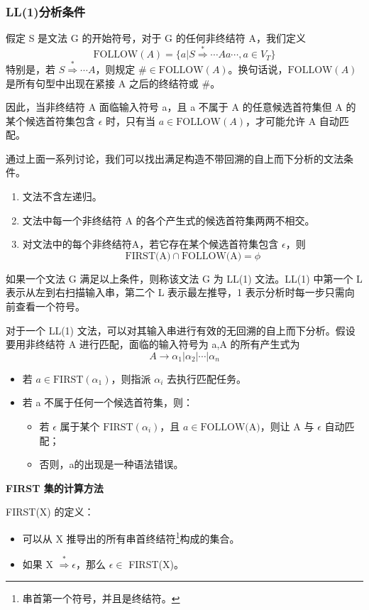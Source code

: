\subsubsection{LL(1)分析条件}

假定 S 是文法 G 的开始符号，对于 G 的任何非终结符 A，我们定义
\[ \text{FOLLOW}(A) = \{ a|S\stackrel{*}{\Rightarrow} \cdots Aa \cdots, a\in V_T \} \]
特别是，若 $S\stackrel{*}{\Rightarrow} \cdots A$，则规定 $\# \in \text{FOLLOW}(A)$。换句话说，$\text{FOLLOW}(A)$ 是所有句型中出现在紧接 A 之后的终结符或 \#。

因此，当非终结符 A 面临输入符号 a，且 a 不属于 A 的任意候选首符集但 A 的某个候选首符集包含 $\epsilon$ 时，只有当 $a \in \text{FOLLOW}(A)$，才可能允许 A 自动匹配。

通过上面一系列讨论，我们可以找出满足构造不带回溯的自上而下分析的文法条件。
\begin{enumerate}
    \item 文法不含左递归。
    \item 文法中每一个非终结符 A 的各个产生式的候选首符集两两不相交。
    \item 对文法中的每个非终结符A，若它存在某个候选首符集包含 $\epsilon$，则
    \[ \text{FIRST(A)} \cap \text{FOLLOW(A)} = \phi \]
\end{enumerate}
如果一个文法 G 满足以上条件，则称该文法 G 为 LL(1) 文法。LL(1) 中第一个 L 表示从左到右扫描输入串，第二个 L 表示最左推导，1 表示分析时每一步只需向前查看一个符号。 

对于一个 LL(1) 文法，可以对其输入串进行有效的无回溯的自上而下分析。假设要用非终结符 A 进行匹配，面临的输入符号为 a,A 的所有产生式为
\[ A \rightarrow \alpha_1 | \alpha_2 | \cdots | \alpha_n \]
\begin{itemize}
    \item 若 $a\in \text{FIRST}(\alpha_1)$，则指派 $\alpha_i$ 去执行匹配任务。
    \item 若 a 不属于任何一个候选首符集，则：
    \begin{itemize}
        \item 若 $\epsilon$ 属于某个 $\text{FIRST}(\alpha_i)$，且 $a\in \text{FOLLOW(A)}$，则让 A 与 $\epsilon$ 自动匹配；
        \item 否则，a的出现是一种语法错误。
    \end{itemize}
\end{itemize}

\noindent\textbf{FIRST 集的计算方法}

FIRST(X) 的定义：
\begin{itemize}
    \item 可以从 X 推导出的所有串首终结符\footnote{串首第一个符号，并且是终结符。}构成的集合。
    \item 如果 X $\stackrel{*}{\Rightarrow} \epsilon$，那么 $\epsilon \in$ FIRST(X)。 
\end{itemize}

